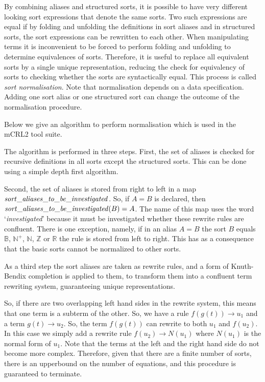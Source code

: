 \documentclass{article}
\newcommand{\Bool}{{\mathbb B}}
\newcommand{\Real}{\mathbb{R}}
\newcommand{\Nat}{\mathbb{N}}
\newcommand{\Pos}{\mathbb{N^{+}}}
\newcommand{\Int}{\mathbb{Z}}
\begin{document}
By combining aliases and structured sorts, 
it is possible to have very different looking sort expressions that denote
the same sorts. Two such expressions are equal if by folding and unfolding the definitions in
sort aliases and in structured sorts, 
the sort expressions can be rewritten to each other. 
When manipulating terms it is inconvenient
to be forced to perform folding and unfolding to determine equivalences of sorts. Therefore, it
is useful to replace all equivalent sorts by a single unique representation, reducing the check
for equivalency of sorts to checking whether the sorts are syntactically equal. This process
is called {\it sort normalisation}. Note that normalisation depends on a data specification.
Adding one sort alias or one structured sort can change the outcome of the 
normalisation procedure. 


Below we give an algorithm to perform normalisation which is used in the mCRL2 tool suite.

The algorithm is performed in three steps.
First, the set of aliases is checked for recursive definitions
in all sorts except the structured sorts. This can be done using 
a simple depth first algorithm.
 
Second, the set of aliases is stored from right to
left in a map $\it sort\_aliases\_to\_be\_investigated$.
So, if $A=B$ is declared, then ${\it sort\_aliases\_to\_be\_investigated}(B)=A$.
The name of this map uses the word `{\it investigated}' because it
must be investigated whether these rewrite rules are confluent.
There is one exception, namely, if in an alias $A=B$ the sort $B$ equals
$\Bool$, $\Pos$, $\Nat$, $\Int$ or $\Real$ the rule is stored from left
to right. This has as a consequence that the basic sorts cannot
be normalized to other sorts.

As a third step the sort aliases are taken as rewrite rules, and 
a form of Knuth-Bendix completion is applied to them, to transform them
into a confluent term rewriting system, guaranteeing unique representations.

So, if there are two overlapping left hand sides in the rewrite system, this
means that one term is a subterm of the other. So, we have a rule 
$f(g(t))\rightarrow u_1$ and a term $g(t)\rightarrow u_2$. So, the term
$f(g(t))$ can rewrite to both $u_1$ and $f(u_2)$. In this case we simply add
a rewrite rule $f(u_2)\rightarrow N(u_1)$ where $N(u_1)$ is the normal form
of $u_1$. Note that the terms at the left and
the right hand side do not become more complex. Therefore, given that there
are a finite number of sorts, there is an upperbound on the number of equations,
and this procedure is guaranteed to terminate.
\end{document}
